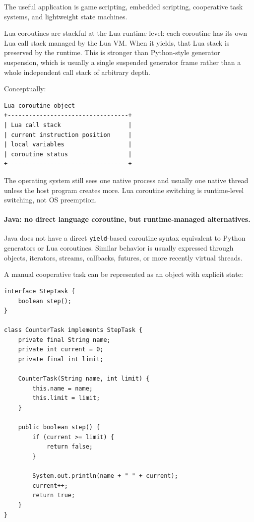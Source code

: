 The useful application is game scripting, embedded scripting, cooperative task systems, and lightweight state machines.

Lua coroutines are stackful at the Lua-runtime level: each coroutine has its own Lua call stack managed by the Lua VM. When it yields, that Lua stack is preserved by the runtime. This is stronger than Python-style generator suspension, which is usually a single suspended generator frame rather than a whole independent call stack of arbitrary depth.

Conceptually:

\begin{verbatim}
Lua coroutine object
+----------------------------------+
| Lua call stack                   |
| current instruction position     |
| local variables                  |
| coroutine status                 |
+----------------------------------+
\end{verbatim}

The operating system still sees one native process and usually one native thread unless the host program creates more. Lua coroutine switching is runtime-level switching, not OS preemption.

\paragraph{Java: no direct language coroutine, but runtime-managed alternatives.}

Java does not have a direct \texttt{yield}-based coroutine syntax equivalent to Python generators or Lua coroutines. Similar behavior is usually expressed through objects, iterators, streams, callbacks, futures, or more recently virtual threads.

A manual cooperative task can be represented as an object with explicit state:

\begin{verbatim}
interface StepTask {
    boolean step();
}

class CounterTask implements StepTask {
    private final String name;
    private int current = 0;
    private final int limit;

    CounterTask(String name, int limit) {
        this.name = name;
        this.limit = limit;
    }

    public boolean step() {
        if (current >= limit) {
            return false;
        }

        System.out.println(name + " " + current);
        current++;
        return true;
    }
}
\end{verbatim}

